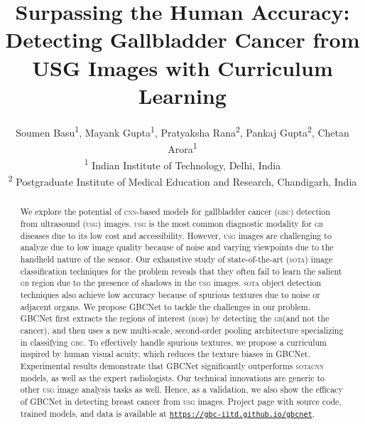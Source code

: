 \documentclass[10pt,twocolumn,letterpaper]{article}
\def\sota{\textsc{sota}\xspace}
\def\cnn{\textsc{cnn}\xspace}
\def\usg{\textsc{usg}\xspace}
\def\gbc{\textsc{gbc}\xspace}
\def\gb{\textsc{gb}\xspace}
\def\rois{\textsc{roi}s\xspace}
\begin{document}
\title{Surpassing the Human Accuracy: \\ Detecting Gallbladder Cancer from USG Images with Curriculum Learning}

\author{Soumen Basu\textsuperscript{1}, Mayank Gupta\textsuperscript{1}, Pratyaksha Rana\textsuperscript{2}, Pankaj Gupta\textsuperscript{2}, Chetan Arora\textsuperscript{1} \\
\textsuperscript{1} Indian Institute of Technology, Delhi, India \\ 
\textsuperscript{2} Postgraduate Institute of Medical Education and Research, Chandigarh, India\\
}

\maketitle

\begin{abstract}
We explore the potential of \cnn-based models for gallbladder cancer (\gbc) detection from ultrasound (\usg) images. \usg is the most common diagnostic modality for \gb diseases due to its low cost and accessibility. However, \usg images are challenging to analyze due to low image quality because of noise and varying viewpoints due to the handheld nature of the sensor. Our exhaustive study of state-of-the-art (\sota) image classification techniques for the problem reveals that they often fail to learn the salient \gb region due to the presence of shadows in the \usg images. \sota object detection techniques also achieve low accuracy because of spurious textures due to noise or adjacent organs. We propose GBCNet to tackle the challenges in our problem. GBCNet first extracts the regions of interest (\rois) by detecting the \gb (and not the cancer), and then uses a new multi-scale, second-order pooling architecture specializing in classifying \gbc. To effectively handle spurious textures, we propose a curriculum inspired by human visual acuity, which reduces the texture biases in GBCNet. Experimental results demonstrate that GBCNet significantly outperforms \sota \cnn models, as well as the expert radiologists. Our technical innovations are generic to other \usg image analysis tasks as well. Hence, as a validation, we also show the efficacy of GBCNet in detecting  breast cancer from \usg images. Project page with source code, trained models, and data is available at \href{https://gbc-iitd.github.io/gbcnet.html}{\texttt{https://gbc-iitd.github.io/gbcnet}}. \end{abstract}
\end{document}
